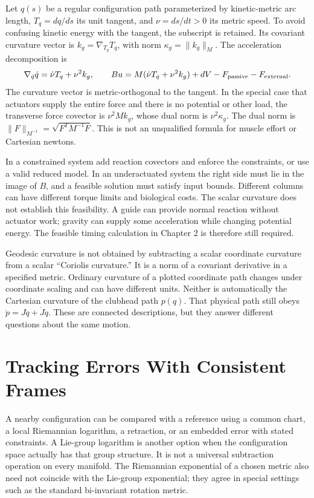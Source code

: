\documentclass[12pt, openany]{book}
\theoremstyle{plain}
\begin{document}
Let $q(s)$ be a regular configuration path parameterized by kinetic-metric
arc length, $T_q=dq/ds$ its unit tangent, and $\nu=ds/dt>0$ its metric speed.
To avoid confusing kinetic energy with the tangent, the subscript is retained.
Its covariant curvature vector is $k_g=\nabla_{T_q}T_q$, with norm
$\kappa_g=\|k_g\|_M$. The acceleration decomposition is
\begin{equation}\label{eq:manifold_path_force}
 \nabla_{\dot q}\dot q=\dot\nu T_q+\nu^2 k_g,\qquad
 B u=M(\dot\nu T_q+\nu^2 k_g)+dV-F_{\rm passive}-F_{\rm external}.
\end{equation}
The curvature vector is metric-orthogonal to the tangent. In the special
case that actuators supply the entire force and there is no potential or
other load, the transverse force covector is $\nu^2 M k_g$, whose dual norm
is $\nu^2\kappa_g$. The dual norm is $\|F\|_{M^{-1}}=\sqrt{F^TM^{-1}F}$.
This is not an unqualified formula for muscle effort or Cartesian newtons.

In a constrained system add reaction covectors and enforce the constraints,
or use a valid reduced model. In an underactuated system the right side must
lie in the image of $B$, and a feasible solution must satisfy input bounds.
Different columns can have different torque limits and biological costs.
The scalar curvature does not establish this feasibility. A guide can provide
normal reaction without actuator work; gravity can supply some acceleration
while changing potential energy. The feasible timing calculation in Chapter 2
is therefore still required.

Geodesic curvature is not obtained by subtracting a scalar coordinate curvature
from a scalar ``Coriolis curvature.'' It is a norm of a covariant derivative
in a specified metric. Ordinary curvature of a plotted coordinate path changes
under coordinate scaling and can have different units. Neither is automatically
the Cartesian curvature of the clubhead path $p(q)$. That physical path still
obeys $\ddot p=J\ddot q+\dot J\dot q$. These are connected descriptions,
but they answer different questions about the same motion.

\section{Tracking Errors With Consistent Frames}

A nearby configuration can be compared with a reference using a common chart,
a local Riemannian logarithm, a retraction, or an embedded error with stated
constraints. A Lie-group logarithm is another option when the configuration
space actually has that group structure. It is not a universal subtraction
operation on every manifold. The Riemannian exponential of a chosen metric
also need not coincide with the Lie-group exponential; they agree in special
settings such as the standard bi-invariant rotation metric.
\end{document}
